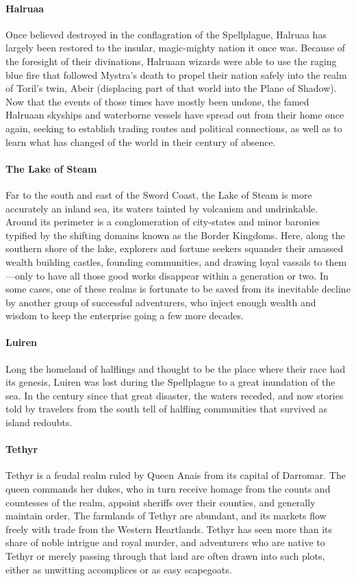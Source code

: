 \documentclass[10pt,a4paper,twoside,twocolumn,openany,bg=print,nodeprecatedcode]{dndbook}
\begin{document}
\paragraph{Halruaa}
Once believed destroyed in the conflagration of the Spellplague, Halruaa has largely been restored to the insular, magic-mighty nation it once was. Because of the foresight of their divinations, Halruaan wizards were able to use the raging blue fire that followed Mystra's death to propel their nation safely into the realm of Toril's twin, Abeir (displacing part of that world into the Plane of Shadow).
Now that the events of those times have mostly been undone, the famed Halruaan skyships and waterborne vessels have spread out from their home once again, seeking to establish trading routes and political connections, as well as to learn what has changed of the world in their century of absence.
\paragraph{The Lake of Steam}
Far to the south and east of the Sword Coast, the Lake of Steam is more accurately an inland sea, its waters tainted by volcanism and undrinkable. Around its perimeter is a conglomeration of city-states and minor baronies typified by the shifting domains known as the Border Kingdoms. Here, along the southern shore of the lake, explorers and fortune seekers squander their amassed wealth building castles, founding communities, and drawing loyal vassals to them—only to have all those good works disappear within a generation or two. In some cases, one of these realms is fortunate to be saved from its inevitable decline by another group of successful adventurers, who inject enough wealth and wisdom to keep the enterprise going a few more decades.
\paragraph{Luiren}
Long the homeland of halflings and thought to be the place where their race had its genesis, Luiren was lost during the Spellplague to a great inundation of the sea. In the century since that great disaster, the waters receded, and now stories told by travelers from the south tell of halfling communities that survived as island redoubts.
\paragraph{Tethyr}
Tethyr is a feudal realm ruled by Queen Anais from its capital of Darromar. The queen commands her dukes, who in turn receive homage from the counts and countesses of the realm, appoint sheriffs over their counties, and generally maintain order. The farmlands of Tethyr are abundant, and its markets flow freely with trade from the Western Heartlands.
Tethyr has seen more than its share of noble intrigue and royal murder, and adventurers who are native to Tethyr or merely passing through that land are often drawn into such plots, either as unwitting accomplices or as easy scapegoats.
\end{document}
